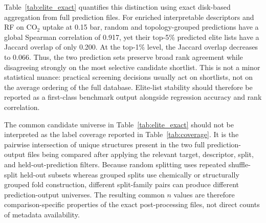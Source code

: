 \documentclass[11pt,a4paper]{article}
\begin{document}
Table~\ref{tab:elite_exact} quantifies this distinction using exact disk-based aggregation from full prediction files. For enriched interpretable descriptors and RF on CO$_2$ uptake at 0.15 bar, random and topology-grouped predictions have a global Spearman correlation of 0.917, yet their top-5\% predicted elite lists have a Jaccard overlap of only 0.200. At the top-1\% level, the Jaccard overlap decreases to 0.066. Thus, the two prediction sets preserve broad rank agreement while disagreeing strongly on the most selective candidate shortlist. This is not a minor statistical nuance: practical screening decisions usually act on shortlists, not on the average ordering of the full database. Elite-list stability should therefore be reported as a first-class benchmark output alongside regression accuracy and rank correlation.

The common candidate universe in Table~\ref{tab:elite_exact} should not be interpreted as the label coverage reported in Table~\ref{tab:coverage}. It is the pairwise intersection of unique structures present in the two full prediction-output files being compared after applying the relevant target, descriptor, split, and held-out-prediction filters. Because random splitting uses repeated shuffle-split held-out subsets whereas grouped splits use chemically or structurally grouped fold construction, different split-family pairs can produce different prediction-output universes. The resulting common $n$ values are therefore comparison-specific properties of the exact post-processing files, not direct counts of metadata availability.
\end{document}
